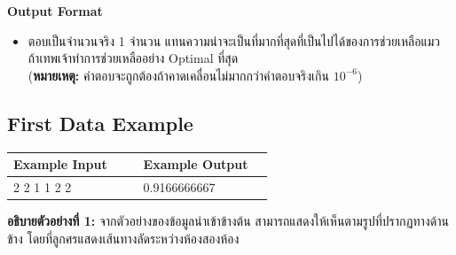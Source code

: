 \medskip\noindent
{\sectionfont\bfseries Output Format}
\begin{itemize}
    \item ตอบเป็นจำนวนจริง 1 จำนวน แทนความน่าจะเป็นที่มากที่สุดที่เป็นไปได้ของการช่วยเหลือแมว
    ถ้าเทพเจ้าทำการช่วยเหลืออย่าง Optimal ที่สุด \\
    (\textbf{หมายเหตุ:} คำตอบจะถูกต้องถ้าคาดเคลื่อนไม่มากกว่าคำตอบจริงเกิน $10^{-6}$)
\end{itemize}

\newpage
\subsection*{\sectionfont\upshape First Data Example}
\begin{tabular}{p{0.45\linewidth}p{0.45\linewidth}}
\toprule
Example Input & Example Output \\
\midrule
\ttfamily\setstretch{0.8}
2 2 1 \newline
1 1 2 2 &
\ttfamily\setstretch{0.8}
0.9166666667 \\
\bottomrule
\end{tabular}

\medskip\noindent
\textbf{อธิบายตัวอย่างที่ 1:} จากตัวอย่างของข้อมูลนำเข้าข้างต้น สามารถแสดงให้เห็นตามรูปที่ปรากฏทางด้านข้าง
โดยที่ลูกศรแสดงเส้นทางลัดระหว่างห้องสองห้อง

